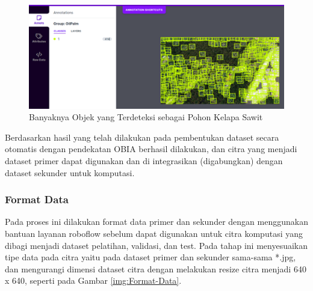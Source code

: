 \begin{figure}[H]
	\vspace{-0.1cm}
	\begin{center}
		\includegraphics[width=1\columnwidth]{bab4/Gambar/Picture21.png}
	\end{center}
	\vspace{-0.2cm}
	\captionsetup{justification=centering}
	\caption{Banyaknya Objek yang Terdeteksi sebagai Pohon Kelapa Sawit}\label{img:Banyaknya-Objek-Yang-Terdeteksi-Sebagai-Pohon-Kelapa}
\end{figure}

Berdasarkan hasil yang telah dilakukan pada pembentukan dataset secara otomatis dengan pendekatan OBIA berhasil dilakukan, dan citra yang menjadi dataset primer dapat digunakan dan di integrasikan (digabungkan) dengan dataset sekunder untuk komputasi. 

\subsubsection{Format Data}
\hspace{1,2cm}
Pada proses ini dilakukan format data primer dan sekunder dengan menggunakan bantuan layanan roboflow sebelum dapat digunakan untuk citra komputasi yang dibagi menjadi dataset pelatihan, validasi, dan test.  Pada tahap ini menyesuaikan tipe data pada citra yaitu pada dataset primer dan sekunder sama-sama *.jpg, dan mengurangi dimensi dataset citra dengan melakukan resize citra menjadi 640 x 640, seperti pada Gambar \ref{img:Format-Data}.


